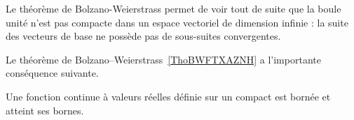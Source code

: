 \begin{example}\label{ExEFYooTILPDk}
    Le théorème de Bolzano-Weierstrass permet de voir tout de suite que la boule unité n'est pas compacte dans un espace vectoriel de dimension infinie : la suite des vecteurs de base ne possède pas de sous-suites convergentes.
\end{example}

Le théorème de Bolzano–Weierstrass~\ref{ThoBWFTXAZNH} a l'importante conséquence suivante.
\begin{theorem}[Weierstrass]		\label{ThoWeirstrassRn}
	Une fonction continue à valeurs réelles définie sur un compact est bornée et atteint ses bornes.
\end{theorem}

